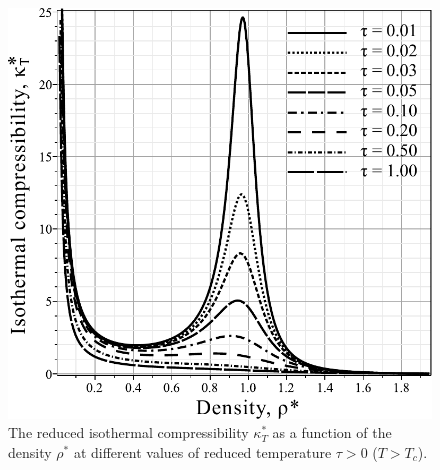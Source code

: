 \begin{figure}[htbp]
	\includegraphics[width=\column]{f2a}
	\vskip-3mm
	\caption{The reduced isothermal compressibility $\kappa^*_T$ as a function of the density $\rho^*$ at different values of reduced temperature $\tau > 0$ ($T > T_c$). 
	}
	\label{fig2a}
\end{figure}

